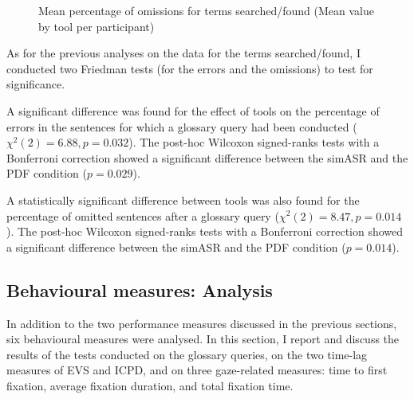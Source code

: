 \begin{figure}
\caption[Mean percentage of omissions (Terms searched/found), by tool and participant]{Mean percentage of omissions for terms searched/found (Mean value by tool per participant)}
\label{fig:OmSFPar}
\end{figure}

As for the previous analyses on the data for the terms searched/found, I conducted two Friedman tests (for the errors and the omissions) to test for significance.\largerpage[-2]\pagebreak

A significant difference was found for the effect of tools on the percentage of errors in the sentences for which a glossary query had been conducted ($\chi^2(2) = 6.88, p = 0.032$). The post-hoc Wilcoxon signed-ranks tests with a Bonferroni correction showed a significant difference between the simASR and the PDF condition ($p = 0.029$).

A statistically significant difference between tools was also found for the percentage of omitted sentences after a glossary query ($\chi^2(2) = 8.47, p = 0.014$). The post-hoc Wilcoxon signed-ranks tests with a Bonferroni correction showed a significant difference between the simASR and the PDF condition ($p = 0.014$).


\subsection{Behavioural measures: Analysis} \label{behaviouralresults}
In addition to the two performance measures discussed in the previous sections, six behavioural measures were analysed. In this section, I report and discuss the results of the tests conducted on the glossary queries, on the two time-lag measures of EVS and ICPD, and on three gaze-related measures: time to first fixation, average fixation duration, and total fixation time.
